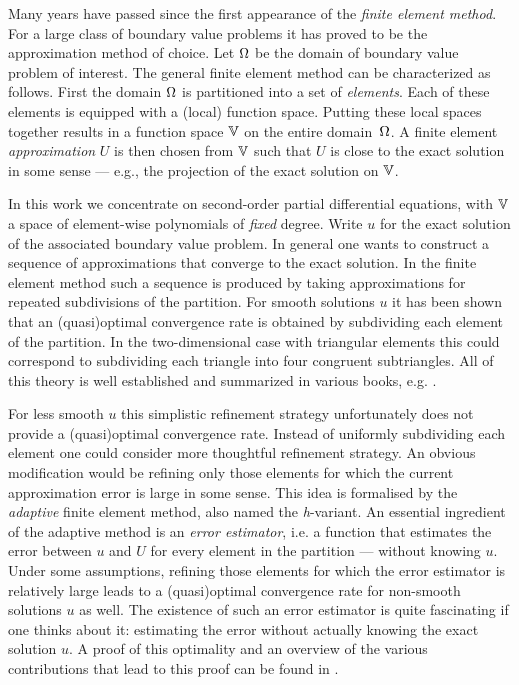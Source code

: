 \documentclass[thesis.tex]{subfiles}
\begin{document}
Many years have passed since the first appearance of the \emph{finite element method}. 
For a large class of boundary value problems it has proved to be the approximation method of choice. 
Let $\Omega$ be the domain of boundary value problem of interest. The general finite element method can be characterized as follows.
First the domain $\Omega$ is partitioned into a set of \emph{elements}.  Each of these elements is equipped with a (local) function space.
Putting these local spaces together results in a function space $\mathbb{V}$ on the entire domain~$\Omega$. A finite element \emph{approximation} $U$
is then chosen from $\mathbb{V}$ such that $U$ is close to the exact solution in some sense 
--- e.g., the projection of the exact solution on $\mathbb{V}$. 

In this work we concentrate on second-order partial differential equations, with $\mathbb{V}$
a space of element-wise polynomials of \emph{fixed} degree. Write $u$ for the exact solution
of the associated boundary value problem. In general one wants to construct a sequence of approximations that converge to
the exact solution. In the finite element method such a sequence is produced by taking
approximations for repeated subdivisions of the partition. For smooth solutions $u$ it has been shown
that an (quasi)optimal convergence rate is obtained by subdividing each element of the partition. 
In the two-dimensional case with triangular elements this could correspond to subdividing each triangle into four
congruent subtriangles. All of this theory is well established and summarized  in various books, e.g. \cite{brenner, zienkiewicz1977finite}.

For less smooth $u$ this simplistic refinement strategy unfortunately does not provide a (quasi)optimal convergence rate.
Instead of uniformly subdividing each element one could consider more thoughtful refinement strategy.
An obvious modification would be refining only those elements for which the current approximation error is large in some sense.
This idea is formalised by the \emph{adaptive} finite element method, also named the \emph{h}-variant.
An essential ingredient of the adaptive method is an \emph{error estimator}, i.e. a function that estimates
the error between $u$ and $U$ for every element in the partition --- without knowing $u$. Under some assumptions, refining those
elements for which the error estimator is relatively large leads to a (quasi)optimal convergence rate for non-smooth
solutions $u$ as well. The existence of such an error estimator is quite fascinating  if one thinks about it: estimating
the error without actually knowing the exact solution $u$.  A proof of this optimality and an overview of the various contributions that lead to this proof can be found in \cite{cascon2008}.
\end{document}

